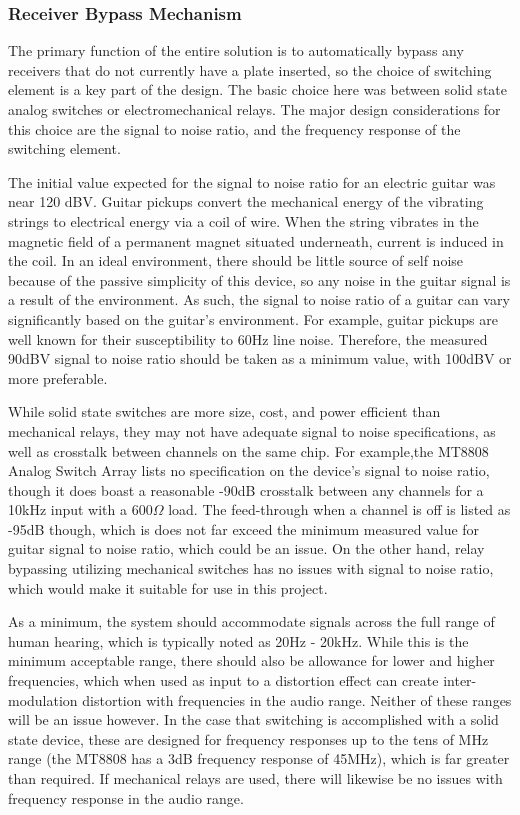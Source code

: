 \documentclass{article}
\begin{document}
		\subsubsection{Receiver Bypass Mechanism}
		The primary function of the entire solution is to automatically bypass any receivers that do not currently have a plate inserted, so the choice of switching element is a key part of the design.  The basic choice here was between solid state analog switches or electromechanical relays.  The major design considerations for this choice are the signal to noise ratio, and the frequency response of the switching element.

		\color{gray}
		The initial value expected for the signal to noise ratio for an electric guitar was near 120 dBV.  Guitar pickups convert the mechanical energy of the vibrating strings to electrical energy via a coil of wire.  When the string vibrates in the magnetic field of a permanent magnet situated underneath, current is induced in the coil.  In an ideal environment, there should be little source of self noise because of the passive simplicity of this device, so any noise in the guitar signal is a result of the environment.  As such, the signal to noise ratio of a guitar can vary significantly based on the guitar's environment.  For example, guitar pickups are well known for their susceptibility to 60Hz line noise.  Therefore, the measured 90dBV signal to noise ratio should be taken as a minimum value, with 100dBV or more preferable.

		While solid state switches are more size, cost, and power efficient than mechanical relays, they may not have adequate signal to noise specifications, as well as crosstalk between channels on the same chip.  For example,the MT8808 Analog Switch Array \cite{Zarlink:MT8808} lists no specification on the device's signal to noise ratio, though it does boast a reasonable -90dB crosstalk between any channels for a 10kHz input with a $600 \Omega$ load.  The feed-through when a channel is off is listed as -95dB though, which is does not far exceed the minimum measured value for guitar signal to noise ratio, which could be an issue.  On the other hand, relay bypassing utilizing mechanical switches has no issues with signal to noise ratio, which would make it suitable for use in this project.

		As a minimum, the system should accommodate signals across the full range of human hearing, which is typically noted as 20Hz - 20kHz.  While this is the minimum acceptable range, there should also be allowance for lower and higher frequencies, which when used as input to a distortion effect can create inter-modulation distortion with frequencies in the audio range.  Neither of these ranges will be an issue however.  In the case that switching is accomplished with a solid state device, these are designed for frequency responses up to the tens of MHz range (the MT8808 has a 3dB frequency response of 45MHz), which is far greater than required.  If mechanical relays are used, there will likewise be no issues with frequency response in the audio range.
		
\end{document}
